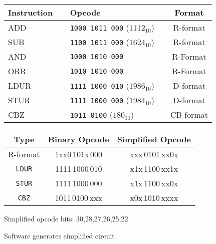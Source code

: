 \begin{frame}[fragile]
\begin{center}
 \begin{center}
     {\small
  \begin{tabular}{llc}
    Instruction~~ & Opcode & Format\\
    \hline
     ADD  & \texttt{1000\,1011\,000} {\tiny{($1112_{10}$)}}~~ & R-format\\
    
    SUB  & \texttt{1100\,1011\,000} {\tiny{($1624_{10}$)}} & R-format\\
   
  AND& \texttt{1000\,1010\,000} & R-Format\\
	 ORR & \texttt{1010\,1010\,000} & R-Format\\
  \hline
    LDUR & \texttt{1111\,1000\,010} {\tiny{($1986_{10}$)}} & D-format\\
     STUR & \texttt{1111\,1000\,000} {\tiny{($1984_{10}$)}} & D-format\\
      CBZ  & \texttt{1011\,0100} {\tiny{($180_{10}$)}}& CB-format\\
    \hline
  \end{tabular}}
  \end{center}

  \bigskip
        \newcommand\gry[1]{{\color{gray}#1}}
        \bigskip
\begin{tabular}{ccc}
	Type & Binary Opcode & Simplified Opcode\\
\hline
	R-format &   1xx0\,101x\,000 & \gry{x}x\gry{x}\,0101\,\gry{x}\gry{x}0\gry{x}\\
	{\tt LDUR} & 1111\,1000\,010 & \gry{x}1\gry{x}\,1100\,\gry{x}\gry{x}1\gry{x}\\
	{\tt STUR} & 1111\,1000\,000 & \gry{x}1\gry{x}\,1100\,\gry{x}\gry{x}0\gry{x}\\
	{\tt CBZ}&   1011\,0100\,xxx & \gry{x}0\gry{x}\,1010\,\gry{x}\gry{x}x\gry{x}
\end{tabular}
	\end{center}
\smallskip

Simplified opcode bits: 30,28,27,26,25,22

\bigskip
Software generates simplified circuit

\end{frame}


     
